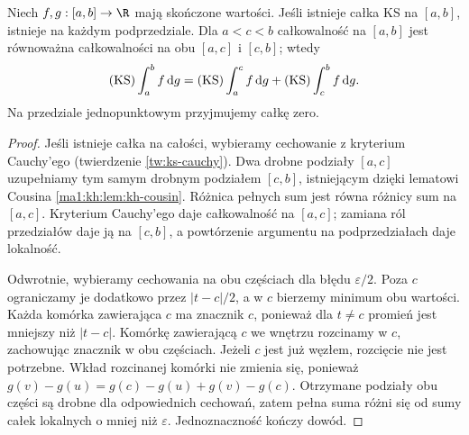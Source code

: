 \begin{twierdzenie}\label{it:thm:ks-locality}
Niech $f,g:[a,b]\to\R$ mają skończone wartości. Jeśli istnieje
całka KS na $[a,b]$, istnieje na każdym podprzedziale.
Dla $a<c<b$ całkowalność na $[a,b]$ jest równoważna
całkowalności na obu $[a,c]$ i $[c,b]$; wtedy
\[
 (\mathrm{KS})\int_a^b f\,\mathrm dg=
 (\mathrm{KS})\int_a^c f\,\mathrm dg+(\mathrm{KS})\int_c^b f\,\mathrm dg.
\]
Na przedziale jednopunktowym przyjmujemy całkę zero.
\end{twierdzenie}
\begin{proof}
Jeśli istnieje całka na całości, wybieramy cechowanie z kryterium
Cauchy'ego (twierdzenie \ref{tw:ks-cauchy}). Dwa drobne podziały
$[a,c]$ uzupełniamy tym samym drobnym podziałem $[c,b]$,
istniejącym dzięki lematowi Cousina \ref{ma1:kh:lem:kh-cousin}.
Różnica pełnych sum jest równa różnicy sum na $[a,c]$.
Kryterium Cauchy'ego daje całkowalność na $[a,c]$; zamiana ról
przedziałów daje ją na $[c,b]$, a powtórzenie argumentu na
podprzedziałach daje lokalność.

Odwrotnie, wybieramy cechowania na obu częściach dla błędu
$\varepsilon/2$. Poza $c$ ograniczamy je dodatkowo przez
$|t-c|/2$, a w $c$ bierzemy minimum obu wartości.
Każda komórka zawierająca $c$ ma znacznik $c$,
ponieważ dla $t\ne c$ promień jest mniejszy niż $|t-c|$.
Komórkę zawierającą $c$ we wnętrzu rozcinamy w $c$,
zachowując znacznik w obu częściach. Jeżeli $c$ jest
już węzłem, rozcięcie nie jest potrzebne.
Wkład rozcinanej komórki nie zmienia się, ponieważ
$g(v)-g(u)=g(c)-g(u)+g(v)-g(c)$.
Otrzymane podziały obu części są drobne dla odpowiednich
cechowań, zatem pełna suma różni się od sumy całek lokalnych
o mniej niż $\varepsilon$. Jednoznaczność kończy dowód.
\end{proof}

